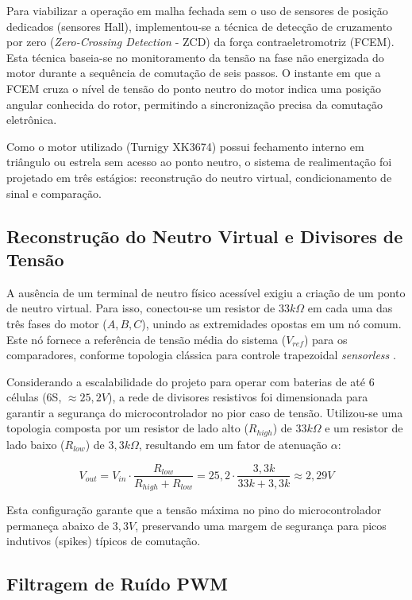 \documentclass[12pt, a4paper, openright, oneside, brazilian]{abntex2}
\begin{document}
Para viabilizar a operação em malha fechada sem o uso de sensores de posição dedicados (sensores Hall), implementou-se a técnica de detecção de cruzamento por zero (\textit{Zero-Crossing Detection} - ZCD) da força contraeletromotriz (FCEM). Esta técnica baseia-se no monitoramento da tensão na fase não energizada do motor durante a sequência de comutação de seis passos. O instante em que a FCEM cruza o nível de tensão do ponto neutro do motor indica uma posição angular conhecida do rotor, permitindo a sincronização precisa da comutação eletrônica.

Como o motor utilizado (Turnigy XK3674) possui fechamento interno em triângulo ou estrela sem acesso ao ponto neutro, o sistema de realimentação foi projetado em três estágios: reconstrução do neutro virtual, condicionamento de sinal e comparação.

\subsection{Reconstrução do Neutro Virtual e Divisores de Tensão}

A ausência de um terminal de neutro físico acessível exigiu a criação de um ponto de neutro virtual. Para isso, conectou-se um resistor de $33k\Omega$ em cada uma das três fases do motor ($A, B, C$), unindo as extremidades opostas em um nó comum. Este nó fornece a referência de tensão média do sistema ($V_{ref}$) para os comparadores, conforme topologia clássica para controle trapezoidal \textit{sensorless} \cite{ti2013sensorless}.

Considerando a escalabilidade do projeto para operar com baterias de até 6 células (6S, $\approx 25,2V$), a rede de divisores resistivos foi dimensionada para garantir a segurança do microcontrolador no pior caso de tensão. Utilizou-se uma topologia composta por um resistor de lado alto ($R_{high}$) de $33k\Omega$ e um resistor de lado baixo ($R_{low}$) de $3,3k\Omega$, resultando em um fator de atenuação $\alpha$:

\begin{equation}
    V_{out} = V_{in} \cdot \frac{R_{low}}{R_{high} + R_{low}} = 25,2 \cdot \frac{3,3k}{33k + 3,3k} \approx 2,29V
\end{equation}

Esta configuração garante que a tensão máxima no pino do microcontrolador permaneça abaixo de $3,3V$, preservando uma margem de segurança para picos indutivos (spikes) típicos de comutação.

\subsection{Filtragem de Ruído PWM}
\end{document}
